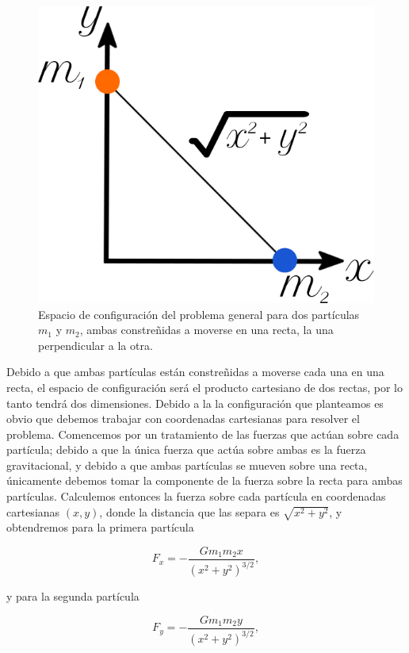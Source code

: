 \documentclass[a4paper,10pt]{article}
\numberwithin{equation}{section}
\begin{document}
\begin{figure}[H]
\center
\includegraphics[scale=0.4]{problema1fig1}
\caption{Espacio de configuración del problema general para dos partículas $m_1$ y $m_2$,
ambas constreñidas a moverse en una recta, la una perpendicular a la otra.}
\label{fig:problema1fig1}
\end{figure}

Debido a que ambas partículas están constreñidas a moverse cada una en una recta, 
el espacio de configuración será el producto cartesiano de dos rectas, por lo tanto
tendrá dos dimensiones. Debido a la la configuración que planteamos es obvio que debemos
trabajar con coordenadas cartesianas para resolver el problema. Comencemos por un tratamiento
de las fuerzas que actúan sobre cada partícula; debido a que la única fuerza que 
actúa sobre ambas es la fuerza gravitacional, y debido a que ambas partículas se mueven
sobre una recta, únicamente debemos tomar la componente de la fuerza sobre la recta
para ambas partículas. Calculemos entonces la fuerza sobre cada partícula en coordenadas
cartesianas $(x,y)$, donde la distancia que las separa es $\sqrt{x^2+y^2}$, 
y obtendremos para la primera partícula

\begin{equation}
 F_x = - \frac{G m_1 m_2 x}{(x^2+y^2)^{3/2}},
\end{equation}

y para la segunda partícula

\begin{equation}
  F_y = - \frac{G m_1 m_2 y}{(x^2+y^2)^{3/2}},
\end{equation}
\end{document}
